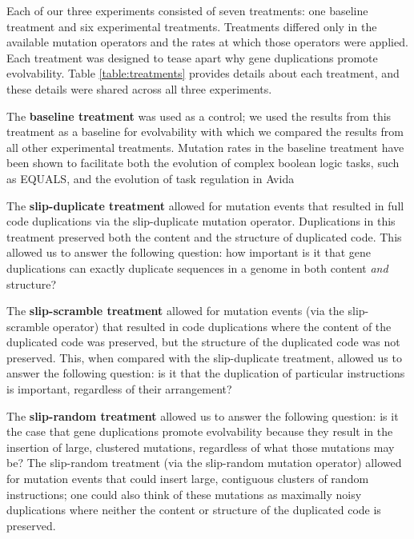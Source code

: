 

Each of our three experiments consisted of seven treatments: one baseline treatment and six experimental treatments. Treatments differed only in the available mutation operators and the rates at which those operators were applied. Each treatment was designed to tease apart why gene duplications promote evolvability. Table \ref{table:treatments} provides details about each treatment, and these details were shared across all three experiments.

The \textbf{baseline treatment} was used as a control; we used the results from this treatment as a baseline for evolvability with which we compared the results from all other experimental treatments. Mutation rates in the baseline treatment have been shown to facilitate both the evolution of complex boolean logic tasks, such as EQUALS, and the evolution of task regulation in Avida \citep{lenski2003evolutionary, Lalejini:2016plasticity}

The \textbf{slip-duplicate treatment} allowed for mutation events that resulted in full code duplications via the slip-duplicate mutation operator. Duplications in this treatment preserved both the content and the structure of duplicated code. This allowed us to answer the following question: how important is it that gene duplications can exactly duplicate sequences in a genome in both content \textit{and} structure?

The \textbf{slip-scramble treatment} allowed for mutation events (via the slip-scramble operator) that resulted in code duplications where the content of the duplicated code was preserved, but the structure of the duplicated code was not preserved. This, when compared with the slip-duplicate treatment, allowed us to answer the following question: is it that the duplication of particular instructions is important, regardless of their arrangement?

The \textbf{slip-random treatment} allowed us to answer the following question: is it the case that gene duplications promote evolvability because they result in the insertion of large, clustered mutations, regardless of what those mutations may be? The slip-random treatment (via the slip-random mutation operator) allowed for mutation events that could insert large, contiguous clusters of random instructions; one could also think of these mutations as maximally noisy duplications where neither the content or structure of the duplicated code is preserved.

